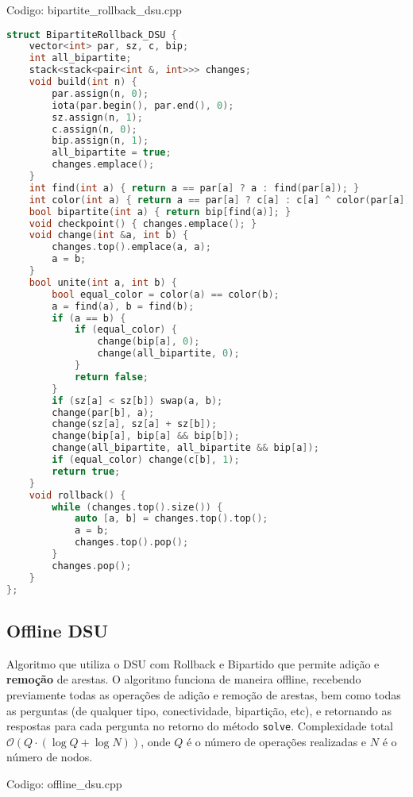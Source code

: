 \documentclass[10pt, a4paper, oneside]{book}
\begin{document}
Codigo: bipartite\_rollback\_dsu.cpp

\begin{lstlisting}[language=C++]
struct BipartiteRollback_DSU {
    vector<int> par, sz, c, bip;
    int all_bipartite;
    stack<stack<pair<int &, int>>> changes;
    void build(int n) {
        par.assign(n, 0);
        iota(par.begin(), par.end(), 0);
        sz.assign(n, 1);
        c.assign(n, 0);
        bip.assign(n, 1);
        all_bipartite = true;
        changes.emplace();
    }
    int find(int a) { return a == par[a] ? a : find(par[a]); }
    int color(int a) { return a == par[a] ? c[a] : c[a] ^ color(par[a]); }
    bool bipartite(int a) { return bip[find(a)]; }
    void checkpoint() { changes.emplace(); }
    void change(int &a, int b) {
        changes.top().emplace(a, a);
        a = b;
    }
    bool unite(int a, int b) {
        bool equal_color = color(a) == color(b);
        a = find(a), b = find(b);
        if (a == b) {
            if (equal_color) {
                change(bip[a], 0);
                change(all_bipartite, 0);
            }
            return false;
        }
        if (sz[a] < sz[b]) swap(a, b);
        change(par[b], a);
        change(sz[a], sz[a] + sz[b]);
        change(bip[a], bip[a] && bip[b]);
        change(all_bipartite, all_bipartite && bip[a]);
        if (equal_color) change(c[b], 1);
        return true;
    }
    void rollback() {
        while (changes.top().size()) {
            auto [a, b] = changes.top().top();
            a = b;
            changes.top().pop();
        }
        changes.pop();
    }
};\end{lstlisting}
\hfill

\subsection{Offline DSU}


Algoritmo que utiliza o DSU com Rollback e Bipartido que permite adição e \textbf{remoção} de arestas. O algoritmo funciona de maneira offline, recebendo previamente todas as operações de adição e remoção de arestas, bem como todas as perguntas (de qualquer tipo, conectividade, bipartição, etc), e retornando as respostas para cada pergunta no retorno do método \texttt{solve}. Complexidade total $\mathcal{O}(Q \cdot (\log Q + \log N))$, onde $Q$ é o número de operações realizadas e $N$ é o número de nodos.

\hfill

Codigo: offline\_dsu.cpp
\end{document}
